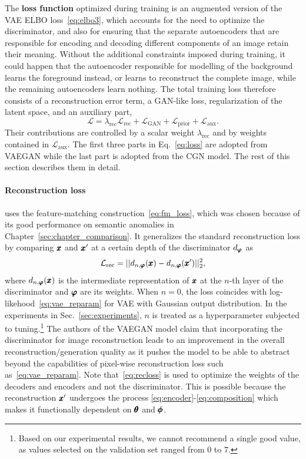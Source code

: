 The \textbf{loss function} optimized during training is an augmented version of the VAE ELBO loss~\eqref{eq:elbo3}, which accounts for the need to optimize the discriminator, and also for ensuring that the separate autoencoders that are responsible for encoding and decoding different components of an image retain their meaning. Without the additional constraints imposed during training, it could happen that the autoencoder responsible for modelling of the background learns the foreground instead, or learns to reconstruct the complete image, while the remaining autoencoders learn nothing. The total training loss therefore consists of a reconstruction error term, a GAN-like loss, regularization of the latent space, and an auxiliary part, 
\begin{equation}
    \mathcal{L} = \lambda_{\text{rec}}\mathcal{L}_{\text{rec}} + \mathcal{L}_{\text{GAN}} +  \mathcal{L}_{\text{prior}} + \mathcal{L}_{\text{aux}}.
    \label{eq:loss}
\end{equation}
Their contributions are controlled by a scalar weight $\lambda_{\text{rec}}$ and by weights contained in $\mathcal{L}_{\text{aux}}.$ The first three parts in Eq.~\eqref{eq:loss} are adopted from VAEGAN while the last part is adopted from the CGN model. The rest of this section describes them in detail.

\paragraph{Reconstruction loss} uses the feature-matching construction~\eqref{eq:fm_loss}, which was chosen because of its good performance on semantic anomalies in Chapter~\ref{sec:chapter_comparison}. It generalizes the standard reconstruction loss by comparing $\pmb{{x}}$ and $\pmb{{x}}'$ at a certain depth of the discriminator $d_{\pmb{{\varphi}}}$ as
\begin{equation} \label{eq:recloss}
     \mathcal{L}_{\text{rec}} = \vert \vert d_{n,\pmb{{\varphi}}}(\pmb{{x}}) - d_{n,\pmb{{\varphi}}}(\pmb{{x}}{'}) \vert \vert_2^2,
\end{equation} 
where $d_{n,\pmb{{\varphi}}}(\pmb{{x}})$ is the intermediate representation of $\pmb{{x}}$ at the $n$-th layer of the discriminator and $\pmb{{\varphi}}$ are its weights. When $n=0$, the loss coincides with log-likehood~\eqref{eq:vae_reparam} for VAE with Gaussian output distribution. In the experiments in Sec.~\ref{sec:experiments}, $n$ is treated as a hyperparameter subjected to tuning.\footnote{Based on our experimental results, we cannot recommend a single good value, as values selected on the validation set ranged from 0 to 7.} The authors of the VAEGAN model claim that incorporating the discriminator for image reconstruction leads to an improvement in the overall reconstruction/generation quality as it pushes the model to be able to abstract beyond the capabilities of pixel-wise reconstruction loss such as~\eqref{eq:vae_reparam}. Note that~\eqref{eq:recloss} is used to optimize the weights of the decoders and encoders and not the discriminator. This is possible because the reconstruction $\pmb{{x}}{'}$ undergoes the process \eqref{eq:encoder}-\eqref{eq:composition} which makes it functionally dependent on $\pmb{{\theta}}$ and $\pmb{{\phi}}$.

